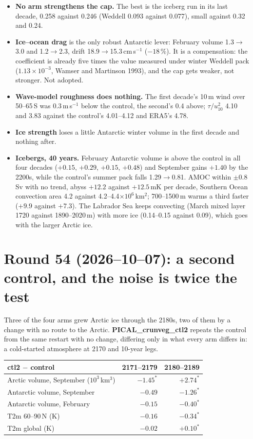 \documentclass[10pt]{article}
\begin{document}
\begin{itemize}\itemsep2pt
\item \textbf{No arm strengthens the cap.} The best is the iceberg run in its last decade, 0.258 against
0.246 (Weddell 0.093 against 0.077), small against 0.32 and 0.24.
\item \textbf{Ice--ocean drag} is the only robust Antarctic lever: February volume 1.3$\to$3.0 and
1.2$\to$2.3, drift 18.9$\to$15.3\,cm\,s$^{-1}$ ($-18$\,\%). It is a compensation: the coefficient is
already five times the value measured under winter Weddell pack ($1.13\times10^{-3}$, Wamser and
Martinson 1993), and the cap gets weaker, not stronger. Not adopted.
\item \textbf{Wave-model roughness does nothing.} The first decade's 10\,m wind over 50--65\,S was
0.3\,m\,s$^{-1}$ below the control, the second's 0.4 above; $\tau/u_{10}^2$ 4.10 and 3.83 against the
control's 4.01--4.12 and ERA5's 4.78.
\item \textbf{Ice strength} loses a little Antarctic winter volume in the first decade and nothing after.
\item \textbf{Icebergs, 40 years.} February Antarctic volume is above the control in all four decades
($+0.15$, $+0.29$, $+0.15$, $+0.48$) and September gains $+1.40$ by the 2200s, while the control's
summer pack falls 1.29$\to$0.81. AMOC within $\pm0.8$\,Sv with no trend, abyss $+12.2$ against $+12.5$\,mK
per decade, Southern Ocean convection area 4.2 against 4.2--4.4$\times10^6$\,km$^2$; 700--1500\,m warms a
third faster ($+9.9$ against $+7.3$). The Labrador Sea keeps convecting (March mixed layer 1720 against
1890--2020\,m) with more ice (0.14--0.15 against 0.09), which goes with the larger Arctic ice.
\end{itemize}

\section{Round 54 (2026--10--07): a second control, and the noise is twice the test}\label{sec:round54}

Three of the four arms grew Arctic ice through the 2180s, two of them by a change with no route to the
Arctic. \textbf{PICAL\_crunveg\_ctl2} repeats the control from the same restart with no change, differing
only in what every arm differs in: a cold-started atmosphere at 2170 and 10-year legs.

\begin{center}\small
\begin{tabular}{lrr}
\toprule
ctl2 $-$ control & 2171--2179 & 2180--2189 \\
\midrule
Arctic volume, September ($10^3$\,km$^3$) & $-1.45^*$ & $+2.74^*$ \\
Antarctic volume, September & $-0.49$ & $-1.26^*$ \\
Antarctic volume, February & $-0.15$ & $-0.40^*$ \\
T2m 60--90\,N (K) & $-0.16$ & $-0.34^*$ \\
T2m global (K) & $-0.02$ & $+0.10^*$ \\
\bottomrule
\end{tabular}
\end{center}
\end{document}
